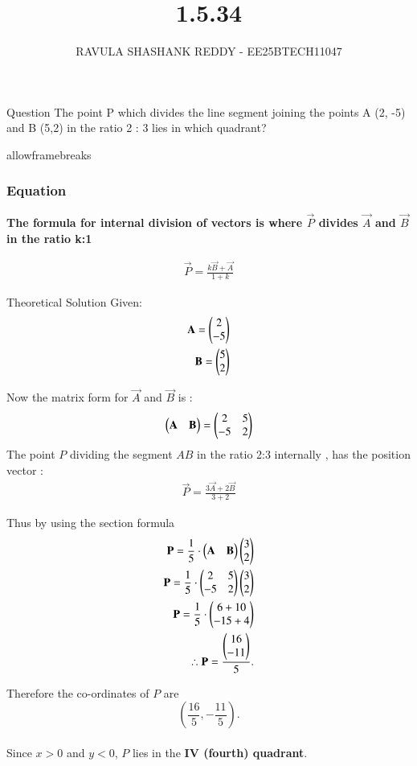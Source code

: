 \documentclass{beamer}
\title %
{1.5.34}
\author %
{RAVULA SHASHANK REDDY - EE25BTECH11047}
\begin{document}
	
	
	\frame{\titlepage}
	\begin{frame}{Question}
		The point P which divides the line segment joining the points A (2, -5)
		and B (5,2) in the ratio 2 : 3 lies in which quadrant?
	\end{frame}
	\begin{frame}{allowframebreaks}
		\frametitle{Equation}
	\textbf{The formula for internal division of vectors is where $\vec{P}$ divides $\vec{A}$ and $\vec{B}$ in the ratio k:1}
		\centering
		
		\label{tab:parameters}
		\begin{align*}
			\vec{P} =	\frac{k\vec{B} + \vec{A}}{1+k} 
		\end{align*}
		\end{frame}	
	
	\begin{frame}{Theoretical Solution}
    Given:
\begin{align}
\mathbf{A} = \begin{pmatrix}2 \\ -5\end{pmatrix} \\ \mathbf{B} = \begin{pmatrix}5 \\ 2\end{pmatrix}
\end{align}

Now the matrix form for $\vec{A}$ and $\vec{B}$ is :
\begin{align}
    \begin{pmatrix}\mathbf{A} & \mathbf{B}\end{pmatrix} = \begin{pmatrix}2 & 5 \\ -5 & 2\end{pmatrix}
\end{align}
The point \(P\) dividing the segment \(AB\) in the ratio 2:3 internally , has the position vector :
\begin{align}
\vec{P} = \frac{ 3\vec{A} +2\vec{B} }{3+2} 
\end{align}
\end{frame}
\begin{frame}
Thus by using the section formula \\
\begin{align} 
\mathbf{P}= \frac{1}{5} \cdot \begin{pmatrix}\mathbf{A} & \mathbf{B}\end{pmatrix}\begin{pmatrix}3 \\ 2\end{pmatrix}\\
\mathbf{P}= \frac{1}{5} \cdot \begin{pmatrix}2 & 5 \\ -5 & 2\end{pmatrix}\begin{pmatrix}3 \\ 2\end{pmatrix}\\
\mathbf{P}= \frac{1}{5} \cdot \begin{pmatrix}6 + 10\\ -15 + 4\end{pmatrix}\\
\therefore \mathbf{P}= \frac{\begin{pmatrix}16 \\ -11\end{pmatrix}}{5}.
\end{align}

Therefore the co-ordinates of \(P\) are \[
\left(\dfrac{16}{5}, -\dfrac{11}{5}\right).
\]
\\

Since \(x>0\) and \(y<0\), \(P\) lies in the \textbf{IV (fourth) quadrant}.

\end{frame}
	
\end{document}
